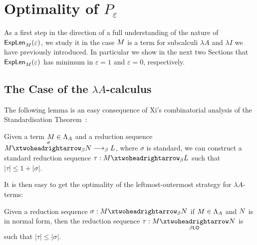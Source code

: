\section{Optimality of $P_\varepsilon$}
As a first step in the direction of a full understanding of the nature
of $\textsf{ExpLen}_{M}(\varepsilon)$, we study it in the
case $M$ is a term for subcalculi $\lambda A$ and
$\lambda I$ we have previously introduced. In particular we show in the
next two Sections that $\textsf{ExpLen}_{M}(\varepsilon)$ has minimum
in $\varepsilon=1$ and $\varepsilon=0$, respectively.
\subsection{The Case of the $\lambda A$-calculus}\label{sec:lambdaA}
The following lemma is an easy consequence of Xi's combinatorial
analysis of the Standardisation Theorem~\cite{xi_upper_1999}:
\begin{lemma}\label{lemma:redbound}
	Given a term $M\in\Lambda_A$ and a reduction sequence $\termone\redbetared{\sigma}
	\termtwo \redbeta \termthree$, where $\sigma$ is standard, we can construct
	a standard reduction sequence
	$\tau:\termone\redbetared{} \termthree$ such that $|\tau|\leq
	1+|\sigma|$.
\end{lemma}
It is then easy to get the optimality of the leftmost-outermost
strategy for $\lambda A$-terms:
\begin{theorem}\label{theorem:stdla}
	Given a reduction sequence
	$\sigma:\termone \redbetared{} \termtwo$
	if $M\in\Lambda_A$ and $N$ is in normal form, then the
	reduction sequence $\tau:\termone\redbetaredlo{} \termtwo$ is
	such that $|\tau|\leq |\sigma|$.
\end{theorem}
